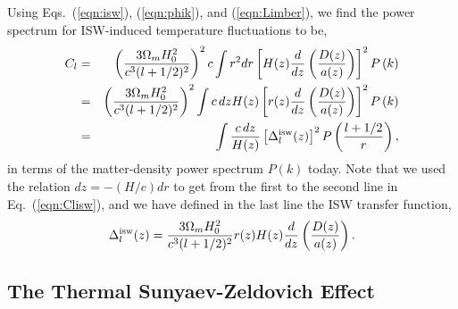 \documentclass[aps,twocolumn,floats,prd,nofootinbib,10pt,floatfix]{revtex4-1}
\begin{document}
Using Eqs.~(\ref{eqn:isw}), (\ref{eqn:phik}), and
(\ref{eqn:Limber}), we find the power spectrum for ISW-induced
temperature fluctuations to be,
\begin{eqnarray}
     C_l & = & \left(\frac{3 \Omega_m H_0^2}{c^3 (l+1/2)^2} \right)^2
     c \int r^2  dr \left[ H(z) \frac{d}{dz}
     \left( \frac{D(z)}{a(z)} \right) \right]^2 P\left(k
     \right) \nonumber \\ 
        & = & \left(\frac{3 \Omega_m H_0^2}{c^3(l+1/2)^2} \right)^2
     \int  c\,dz H(z) \left[r(z) \frac{d}{dz}
     \left( \frac{D(z)}{a(z)} \right) \right]^2 P\left(k
     \right) \nonumber \\
     & = &  \int \frac{c\, dz}{H(z)} \left[ \Delta^{\rm
     isw}_l(z)\right]^2 P\left(\frac{l+1/2}{r}\right),
\label{eqn:Clisw}
\end{eqnarray}
in terms of the matter-density power spectrum $P(k)$ today.
Note that we used the relation $dz = -(H/c) dr$ to get from the
first to the second line in Eq.~(\ref{eqn:Clisw}), and we have
defined in the last line the ISW transfer function,
\begin{equation}
     \Delta^{\rm isw}_l(z) = \frac{3 \Omega_m H_0^2}{c^3 (l+1/2)^2}
     r(z) H(z) \frac{d}{dz}
     \left( \frac{D(z)}{a(z)} \right).
\label{eqn:iswtransfer}
\end{equation}


\subsection{The Thermal Sunyaev-Zeldovich Effect}
\end{document}
